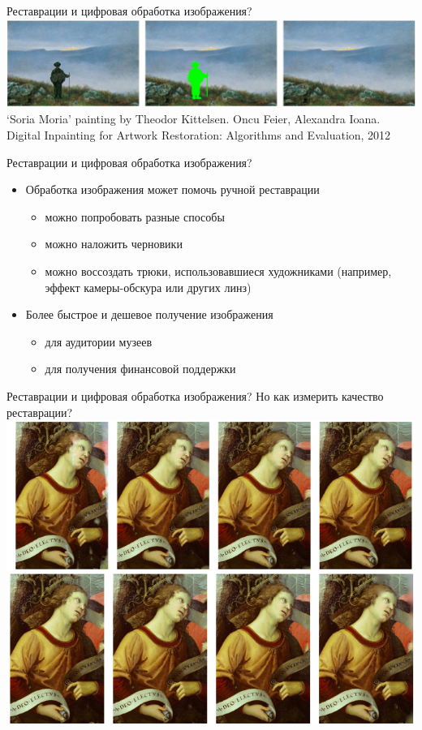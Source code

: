 \documentclass[13pt, t]{beamer}
\begin{document}
\begin{frame}{Реставрации и цифровая обработка изображения?}
\includegraphics[width=\linewidth]{images/06-Kittelsen.jpg}\\

`Soria Moria' painting by Theodor Kittelsen.
\vfill
Oncu Feier, Alexandra Ioana. Digital Inpainting for Artwork Restoration: Algorithms and Evaluation, 2012
\end{frame}

\begin{frame}{Реставрации и цифровая обработка изображения?}
\begin{itemize}
\item Обработка изображения может помочь ручной реставрации
\begin{itemize}
\item можно попробовать разные способы
\item можно наложить черновики
\item можно воссоздать трюки, использовавшиеся художниками (например, эффект камеры-обскура или других линз)
\end{itemize}
\item Более быстрое и дешевое получение изображения
\begin{itemize}
\item для аудитории музеев
\item для получения финансовой поддержки
\end{itemize}
\end{itemize}
\end{frame}

\begin{frame}{Реставрации и цифровая обработка изображения?}
Но как измерить качество реставрации?\\
\includegraphics[width=0.95\linewidth]{images/07-Angel.jpg}
\end{frame}
\end{document}
